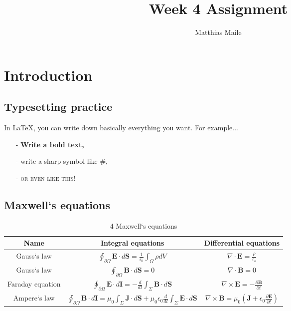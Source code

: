 \documentclass{article}
\author{Matthias Maile}
\title{Week 4 Assignment}
\begin{document}
\maketitle
\tableofcontents

\section{Introduction}
\subsection{Typesetting practice}
In \LaTeX, you can write down basically everything you want. For example...
\begin{itemize}
	\item[-] \textbf{Write a bold text,}
	\item[-] write a sharp symbol like \#,
	\item[-] \textsc{or even like this!}
\end{itemize}

\newpage
\subsection{Maxwell`s equations}
\begin{table}[H]
	\begin{tabular}{|c || c | c|}
		\hline
		Name & Integral equations & Differential equations \\
		\hline
		Gauss`s law &
		$\oint_{\partial \Omega} \textbf{E} \cdot d\textbf{S} = \frac{1}{\epsilon_0} \int_\Omega \rho dV$ &
		$\nabla \cdot \textbf{E} = \frac{\rho}{\epsilon_o}$ \\
		\hline
		Gauss`s law &
		$\oint_{\partial \Omega} \textbf{B} \cdot d\textbf{S} = 0$ &
		$\nabla \cdot \textbf{B} = 0$ \\
		\hline
		Faraday equation &
		$\oint_{\partial \Omega} \textbf{E} \cdot d\textbf{I} = 
		-\frac{d}{dt} \int_{\Sigma} \textbf{B} \cdot d\textbf{S}$ &
		$\nabla \times \textbf{E} = -\frac{\partial\textbf{B}}{\partial t}$ \\
		\hline
		Ampere`s law &
		$\oint_{\partial \Omega} \textbf{B} \cdot d\textbf{I} = 
		\mu_0 \int_{\Sigma} \textbf{J} \cdot d\textbf{S} +
		\mu_0\epsilon_0 \frac{d}{dt} \int_{\Sigma} \textbf{E} \cdot d\textbf{S}$ &
		$\nabla \times \textbf{B} = \mu_0 \left(\textbf{J} + \epsilon_0 \frac{\partial\textbf{E}}{\partial t} \right)$ \\
		\hline
	\end{tabular}
	\caption{4 Maxwell`s equations}
	\label{tab:equations}
\end{table}
\end{document}
